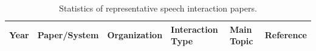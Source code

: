 \begin{table}[t]
    \centering
    \caption{Statistics of representative speech interaction papers.}
    \label{tab:paper-statistics}
    \small
    \begin{tabular}{l|l|l|l|l|l}
        \toprule
        Year & Paper/System & Organization & Interaction Type & Main Topic & Reference \\
        \midrule
        \bottomrule
    \end{tabular}
\end{table}
